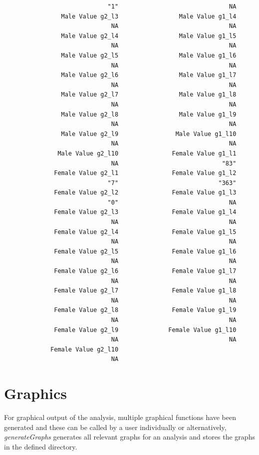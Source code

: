 \documentclass[12pt,a4paper]{article}
\begin{document}
\begin{verbatim}
                             "1"                               NA 
                Male Value g2_l3                 Male Value g1_l4 
                              NA                               NA 
                Male Value g2_l4                 Male Value g1_l5 
                              NA                               NA 
                Male Value g2_l5                 Male Value g1_l6 
                              NA                               NA 
                Male Value g2_l6                 Male Value g1_l7 
                              NA                               NA 
                Male Value g2_l7                 Male Value g1_l8 
                              NA                               NA 
                Male Value g2_l8                 Male Value g1_l9 
                              NA                               NA 
                Male Value g2_l9                Male Value g1_l10 
                              NA                               NA 
               Male Value g2_l10               Female Value g1_l1 
                              NA                             "83" 
              Female Value g2_l1               Female Value g1_l2 
                             "7"                            "363" 
              Female Value g2_l2               Female Value g1_l3 
                             "0"                               NA 
              Female Value g2_l3               Female Value g1_l4 
                              NA                               NA 
              Female Value g2_l4               Female Value g1_l5 
                              NA                               NA 
              Female Value g2_l5               Female Value g1_l6 
                              NA                               NA 
              Female Value g2_l6               Female Value g1_l7 
                              NA                               NA 
              Female Value g2_l7               Female Value g1_l8 
                              NA                               NA 
              Female Value g2_l8               Female Value g1_l9 
                              NA                               NA 
              Female Value g2_l9              Female Value g1_l10 
                              NA                               NA 
             Female Value g2_l10 
                              NA 
\end{verbatim}
\endgroup                            
\section{Graphics}
For graphical output of the analysis, multiple graphical functions have been generated and these can be called by a user individually or alternatively, 
\textit{generateGraphs} generates all relevant graphs for an analysis and stores the graphs in the defined directory. 
\end{document}
